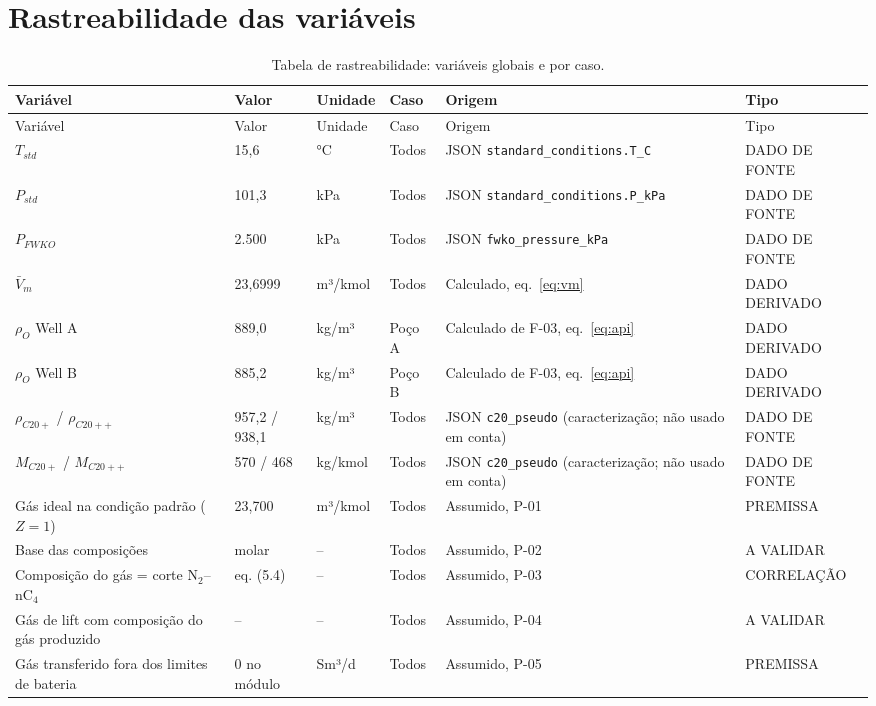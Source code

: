 \documentclass[11pt,a4paper]{article}
\numberwithin{equation}{section}
\numberwithin{table}{section}
\numberwithin{figure}{section}
\newcommand{\tipo}[1]{\textsf{\footnotesize #1}}
\newcommand{\AV}{\textcolor{red!70!black}{\tipo{A VALIDAR}}}
\begin{document}
\section{Rastreabilidade das variáveis}\label{app:rastro}
{\footnotesize\setlength{\tabcolsep}{3pt}\begin{longtable}{L{3.6cm}L{2.2cm}lL{1.0cm}L{4.2cm}l}
\caption{Tabela de rastreabilidade: variáveis globais e por caso.}\label{tab:rastro}\\\toprule
Variável & Valor & Unidade & Caso & Origem & Tipo\\\midrule\endfirsthead
\toprule Variável & Valor & Unidade & Caso & Origem & Tipo\\\midrule\endhead

$T_{std}$ & 15{,}6 & °C & Todos & JSON \texttt{standard\_conditions.T\_C} & \tipo{DADO DE FONTE}\\
$P_{std}$ & 101{,}3 & kPa & Todos & JSON \texttt{standard\_conditions.P\_kPa} & \tipo{DADO DE FONTE}\\
$P_{FWKO}$ & 2.500 & kPa & Todos & JSON \texttt{fwko\_pressure\_kPa} & \tipo{DADO DE FONTE}\\
$\bar V_m$ & 23{,}6999 & m³/kmol & Todos & Calculado, eq.~\eqref{eq:vm} & \tipo{DADO DERIVADO}\\
$\rho_{O}$ Well A & 889{,}0 & kg/m³ & Poço A & Calculado de F-03, eq.~\eqref{eq:api} & \tipo{DADO DERIVADO}\\
$\rho_{O}$ Well B & 885{,}2 & kg/m³ & Poço B & Calculado de F-03, eq.~\eqref{eq:api} & \tipo{DADO DERIVADO}\\
$\rho_{C20+}$ / $\rho_{C20++}$ & 957{,}2 / 938{,}1 & kg/m³ & Todos & JSON \texttt{c20\_pseudo} (caracterização; não usado em conta) & \tipo{DADO DE FONTE}\\
$M_{C20+}$ / $M_{C20++}$ & 570 / 468 & kg/kmol & Todos & JSON \texttt{c20\_pseudo} (caracterização; não usado em conta) & \tipo{DADO DE FONTE}\\
Gás ideal na condição padrão ($Z=1$) & 23{,}700 & m³/kmol & Todos & Assumido, P-01 & \tipo{PREMISSA}\\
Base das composições & molar & -- & Todos & Assumido, P-02 & \AV\\
Composição do gás = corte N$_2$--nC$_4$ & eq. (5.4) & -- & Todos & Assumido, P-03 & \tipo{CORRELAÇÃO}\\
Gás de lift com composição do gás produzido & -- & -- & Todos & Assumido, P-04 & \AV\\
Gás transferido fora dos limites de bateria & 0 no módulo & Sm³/d & Todos & Assumido, P-05 & \tipo{PREMISSA}\\

\end{longtable}}
\end{document}
